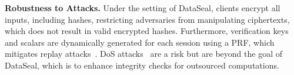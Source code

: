 \noindent\textbf{Robustness to Attacks.} Under the setting of DataSeal, clients encrypt all inputs, including hashes, restricting adversaries from manipulating ciphertexts, which does not result in valid encrypted hashes. Furthermore, verification keys and scalars are dynamically generated for each session using a PRF, which mitigates replay attacks~\cite{mo2009secure}. DoS attacks~\cite{long2001trends} are a risk but are beyond the goal of DataSeal, which is to enhance integrity checks for outsourced computations.

